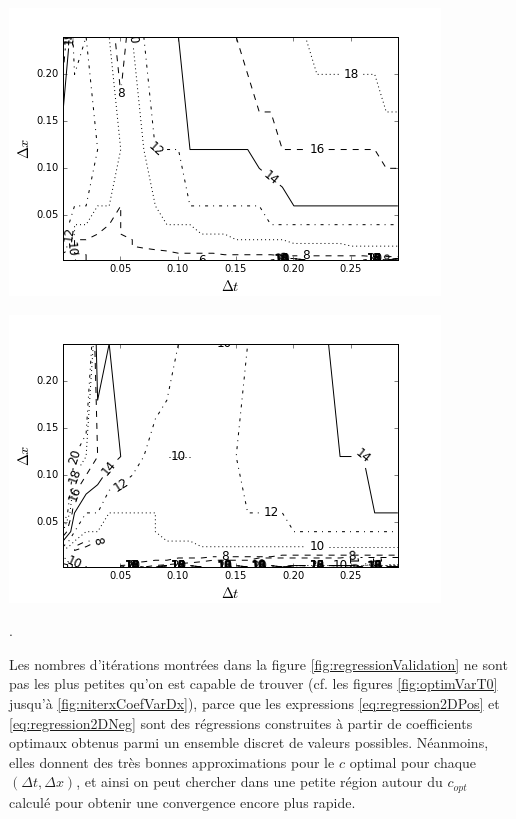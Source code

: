 \begingroup
\noindent
\begin{minipage}[t]{.45\linewidth}
	\includegraphics[scale=.45]{figures/FinalFigures/contourValidationN.png}
\end{minipage}
\hfill
\begin{minipage}[t]{.45\linewidth}
	\includegraphics[scale=.45]{figures/FinalFigures/contourValidationP.png}
\end{minipage}
.
\endgroup

\indent Les nombres d'itérations montrées dans la figure \ref{fig:regressionValidation} ne sont pas les plus petites qu'on est capable de trouver (cf. les figures \ref{fig:optimVarT0} jusqu'à \ref{fig:niterxCoefVarDx}), parce que les expressions \eqref{eq:regression2DPos} et \eqref{eq:regression2DNeg} sont des régressions construites à partir de coefficients optimaux obtenus parmi un ensemble discret de valeurs possibles. Néanmoins, elles donnent des très bonnes approximations pour le $c$ optimal pour chaque $(\Delta t, \Delta x)$, et ainsi on peut chercher dans une petite région autour du $c_{opt}$ calculé pour obtenir une convergence encore plus rapide.

